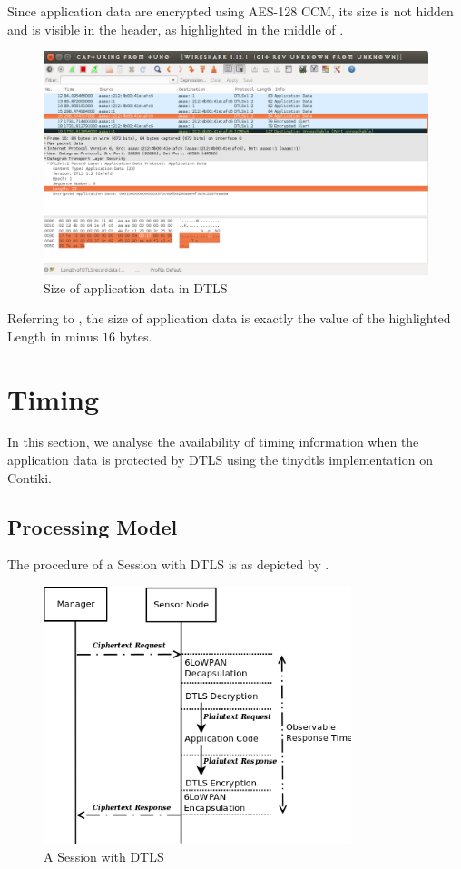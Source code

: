 Since application data are encrypted using AES-128 CCM, its size is not hidden and is visible in the header, as highlighted in the middle of .

\begin{figure}[ht!]
	\center
	\includegraphics[width=.7\textwidth]{fig/dtlslength.png}
	\caption{Size of application data in DTLS}
	\label{Fig: Size of application data in DTLS}
\end{figure}

Referring to \cite{rfc5116}, the size of application data is exactly the value of the highlighted Length in  minus $16$ bytes.


\section{Timing}

In this section, we analyse the availability of timing information when the application data is protected by DTLS using the tinydtls implementation on Contiki.

\subsection{Processing Model}

The procedure of a Session with DTLS is as depicted by .

\begin{figure}[ht!]
	\center
	\includegraphics[width=0.8\textwidth]{fig/dtls_session.png}
	\caption{A Session with DTLS}
	\label{Fig: A Session with DTLS}
\end{figure}

